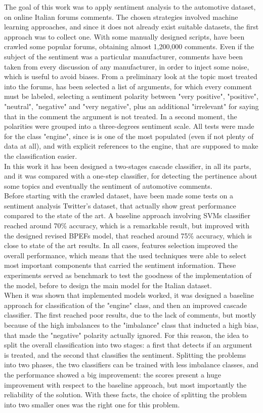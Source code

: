 The goal of this work was to apply sentiment analysis to the automotive dataset, on online Italian forums comments. The chosen strategies involved machine learning approaches, and since it does not already exist suitable datasets, the first approach was to collect one. With some manually designed scripts, have been crawled some popular forums, obtaining almost 1,200,000 comments. Even if the subject of the sentiment was a particular manufacturer, comments have been taken from every discussion of any manufacturer, in order to inject some noise, which is useful to avoid biases. From a preliminary look at the topic most treated into the forums, has been selected a list of arguments, for which every comment must be labeled, selecting a sentiment polarity between "very positive", "positive", "neutral", "negative" and "very negative", plus an additional "irrelevant" for saying that in the comment the argument is not treated. In a second moment, the polarities were grouped into a three-degrees sentiment scale. All tests were made for the class "engine", since is is one of the most populated (even if not plenty of data at all), and with explicit references to the engine, that are supposed to make the classification easier.\\
In this work it has been designed a two-stages cascade classifier, in all its parts, and it was compared with a one-step classifier, for detecting the pertinence about some topics and eventually the sentiment of automotive comments.\\
Before starting with the crawled dataset, have been made some tests on a sentiment analysis Twitter's dataset, that actually show great performance compared to the state of the art. A baseline approach involving \aclp{SVM} classifier reached around 70\% accuracy, which is a remarkable result, but improved with the designed revised \aclp{BPEF} model, that reached around 75\% accuracy, which is close to state of the art results. In all cases, features selection improved the overall performance, which means that the used techniques were able to select most important components that carried the sentiment information. These experiments served as benchmark to test the goodness of the implementation of the model, before to design the main model for the Italian dataset.\\
When it was shown that implemented models worked, it was designed a baseline approach for classification of the "engine" class, and then an improved cascade classifier. The first reached poor results, due to the lack of comments, but mostly because of the high imbalances to the "imbalance" class that inducted a high bias, that made the "negative" polarity actually ignored. For this reason, the idea to split the overall classification into two stages: a first that detects if an argument is treated, and the second that classifies the sentiment. Splitting the problems into two phases, the two classifiers can be trained with less imbalance classes, and the performance showed a big improvement: the scores present a huge improvement with respect to the baseline approach, but most importantly the reliability of the solution. With these facts, the choice of splitting the problem into two smaller ones was the right one for this problem. %
